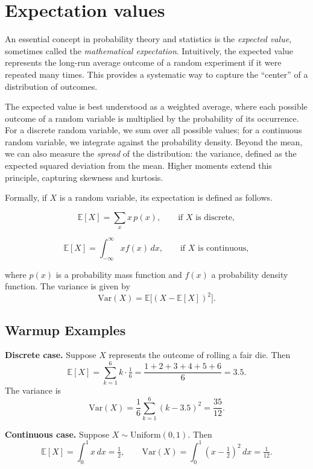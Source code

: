 \documentclass{book}
\begin{document}
\section{Expectation values}

An essential concept in probability theory and statistics is the \emph{expected value}, sometimes called the \emph{mathematical expectation}. Intuitively, the expected value represents the long-run average outcome of a random experiment if it were repeated many times. This provides a systematic way to capture the ``center'' of a distribution of outcomes.

The expected value is best understood as a weighted average, where each possible outcome of a random variable is multiplied by the probability of its occurrence. For a discrete random variable, we sum over all possible values; for a continuous random variable, we integrate against the probability density. Beyond the mean, we can also measure the \emph{spread} of the distribution: the variance, defined as the expected squared deviation from the mean. Higher moments extend this principle, capturing skewness and kurtosis.

Formally, if $X$ is a random variable, its expectation is defined as follows.

\[
\mathbb{E}[X] = \sum_{x} x \, p(x), \qquad \text{if $X$ is discrete},
\]

\[
\mathbb{E}[X] = \int_{-\infty}^\infty x f(x)\, dx, \qquad \text{if $X$ is continuous},
\]

where $p(x)$ is a probability mass function and $f(x)$ a probability density function. The variance is given by
\[
\mathrm{Var}(X) = \mathbb{E}\!\big[(X-\mathbb{E}[X])^2\big].
\]

\medskip

\subsection*{Warmup Examples}

\textbf{Discrete case.} Suppose $X$ represents the outcome of rolling a fair die. Then
\[
\mathbb{E}[X] = \sum_{k=1}^6 k \cdot \tfrac{1}{6} = \frac{1+2+3+4+5+6}{6} = 3.5.
\]
The variance is
\[
\mathrm{Var}(X) = \frac{1}{6}\sum_{k=1}^6 (k-3.5)^2 = \frac{35}{12}.
\]

\textbf{Continuous case.} Suppose $X \sim \text{Uniform}(0,1)$. Then
\[
\mathbb{E}[X] = \int_0^1 x \, dx = \tfrac{1}{2}, \qquad 
\mathrm{Var}(X) = \int_0^1 (x-\tfrac{1}{2})^2 \, dx = \tfrac{1}{12}.
\]
\end{document}
